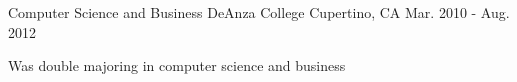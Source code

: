 

\begin{cventries}

  \cventry
    {Computer Science and Business} %
    {DeAnza College} %
    {Cupertino, CA} %
    {Mar. 2010 - Aug. 2012} %
    {
      \begin{cvitems} %
        \item {Was double majoring in computer science and business}
      \end{cvitems}
    }

\end{cventries}
